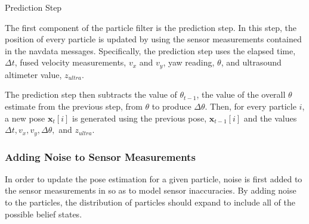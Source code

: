 		\begin{algorithm}
			\centering
			\caption{Prediction Step} 
			\begin{algorithmic}[1]
						 \label{predict:line:theta}
						 \label{predict:line:transform}
						 \label{predict:line:position}
					\EndFor
				\EndFunction
			\end{algorithmic}
		\end{algorithm}

		The first component of the particle filter is the prediction step. In this step, the position of every particle is updated by using the sensor measurements contained in the navdata messages. Specifically, the prediction step uses the elapsed time, $\Delta t$, fused velocity measurements, $v_x$ and $v_y$, yaw reading, $\theta$, and ultrasound altimeter value, $z_{ultra}$.

		The prediction step then subtracts the value of $\theta_{t-1}$, the value of the overall $\theta$ estimate from the previous step, from $\theta$ to produce $\Delta\theta$. Then, for every particle $i$, a new pose $\textbf{x}_t[i]$ is generated using the previous pose, $\textbf{x}_{t-1}[i]$ and the values $\Delta t, v_x, v_y, \Delta\theta,$ and $z_{ultra}$.

		\subsubsection{Adding Noise to Sensor Measurements}
			In order to update the pose estimation for a given particle, noise is first added to the sensor measurements in so as to model sensor inaccuracies. By adding noise to the particles, the distribution of particles should expand to include all of the possible belief states.

